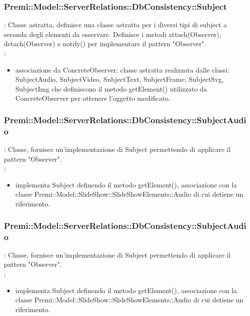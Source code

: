 {             \subsubsection{Premi::Model::ServerRelations::DbConsistency::Subject}{
				\textbf{\tipo}: Classe astratta, definisce una classe astratta per i diversi tipi di subject a seconda degli elementi da osservare. Definisce i metodi attach(Observer), detach(Observer) e notify() per implementare il pattern "Observer".\\	
				\textbf{\relaz}: 
				\begin{itemize}
					\item associazione da ConcreteObserver; classe astratta realizzata dalle classi: SubjectAudio, SubjectVideo, SubjectText, SubjectFrame, SubjectSvg, SubjectImg che definiscono il metodo getElement() utilizzato da ConcreteObserver per ottenere l’oggetto modificato.
				\end{itemize}	
            }
            
             \subsubsection{Premi::Model::ServerRelations::DbConsistency::SubjectAudio}{
				\textbf{\tipo}: Classe, fornisce un’implementazione di Subject permettendo di applicare il pattern "Observer".\\	
				\textbf{\relaz}: 
				\begin{itemize}
					\item implementa Subject definendo il metodo getElement(), associazione con la classe Premi::Model::SlideShow::SlideShowElements::Audio di cui detiene un riferimento.
				\end{itemize}	
            }
            
            \subsubsection{Premi::Model::ServerRelations::DbConsistency::SubjectAudio}{
				\textbf{\tipo}: Classe, fornisce un’implementazione di Subject permettendo di applicare il pattern "Observer".\\	
				\textbf{\relaz}: 
				\begin{itemize}
					\item implementa Subject definendo il metodo getElement(), associazione con la classe Premi::Model::SlideShow::SlideShowElements::Audio di cui detiene un riferimento.
				\end{itemize}	
            }
            
}
